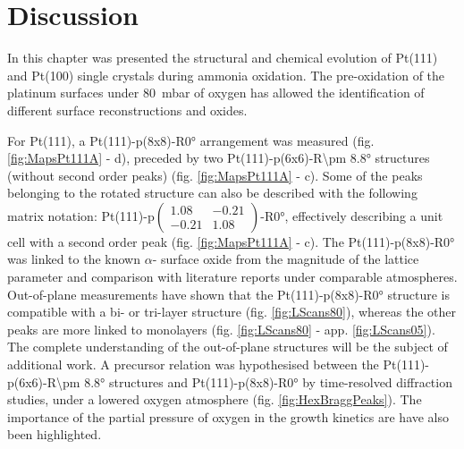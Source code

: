 \section{Discussion}

In this chapter was presented the structural and chemical evolution of Pt(111) and Pt(100) single crystals during ammonia oxidation.
The pre-oxidation of the platinum surfaces under \qty{80}{\milli\bar} of oxygen has allowed the identification of different surface reconstructions and oxides.

For Pt(111), a Pt(111)-p(8x8)-R\ang{0} arrangement was measured (fig. \ref{fig:MapsPt111A} - d), preceded by two Pt(111)-p(6x6)-R\ang{\pm 8.8} structures (without second order peaks) (fig. \ref{fig:MapsPt111A} - c).
Some of the peaks belonging to the rotated structure can also be described with the following matrix notation: Pt(111)-p$\begin{pmatrix} 1.08 & -0.21 \\ -0.21 & 1.08 \end{pmatrix}$-R\ang{0}, effectively describing a unit cell with a second order peak (fig. \ref{fig:MapsPt111A} - c).
The Pt(111)-p(8x8)-R\ang{0} was linked to the known $\alpha$- surface oxide from the magnitude of the lattice parameter and comparison with literature reports under comparable atmospheres.
Out-of-plane measurements have shown that the Pt(111)-p(8x8)-R\ang{0} structure is compatible with a bi- or tri-layer structure (fig. \ref{fig:LScans80}), whereas the other peaks are more linked to monolayers (fig. \ref{fig:LScans80} - app. \ref{fig:LScans05}).
The complete understanding of the out-of-plane structures will be the subject of additional work.
A precursor relation was hypothesised between the Pt(111)-p(6x6)-R\ang{\pm 8.8} structures and Pt(111)-p(8x8)-R\ang{0} by time-resolved diffraction studies, under a lowered oxygen atmosphere (fig. \ref{fig:HexBraggPeaks}).
The importance of the partial pressure of oxygen in the growth kinetics are have also been highlighted.

